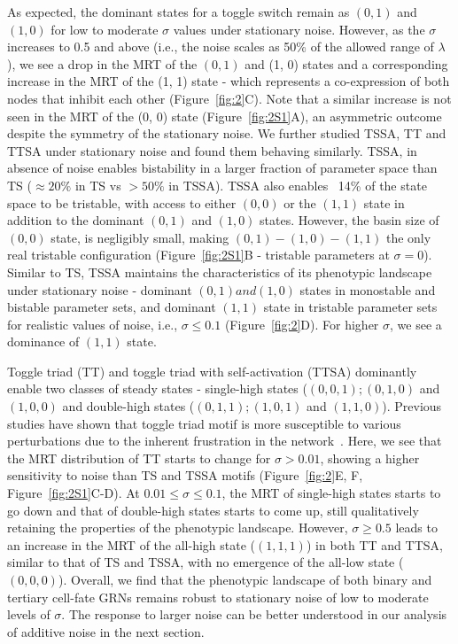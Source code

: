 \documentclass[11pt]{article}
\begin{document}
As expected, the dominant states for a toggle switch remain as $(0, 1)$ and $(1, 0)$ for low to moderate $\sigma$ values under stationary noise. However, as the $\sigma$ increases to 0.5 and above (i.e., the noise scales as 50\% of the allowed range of $\lambda$), we see a drop in the MRT of the $(0,1)$ and (1, 0) states and a corresponding increase in the MRT of the (1, 1) state - which represents a co-expression of both nodes that inhibit each other (Figure~\ref{fig:2}C). Note that a similar increase is not seen in the MRT of the (0, 0) state (Figure~\ref{fig:2S1}A), an asymmetric outcome despite the symmetry of the stationary noise. We further studied TSSA, TT and TTSA under stationary noise and found them behaving similarly. TSSA, in absence of noise enables bistability in a larger fraction of parameter space than TS ($\approx 20\%$ in TS vs $>50\%$ in TSSA). TSSA also enables ~14\% of the state space to be tristable, with access to either $(0, 0)$ or the $(1, 1)$ state in addition to the dominant $(0, 1)$ and $(1, 0)$ states. However, the basin size of $(0, 0)$ state, is negligibly small, making $(0, 1) - (1, 0)-(1, 1)$ the only real tristable configuration (Figure~\ref{fig:2S1}B - tristable parameters at $\sigma = 0$). Similar to TS, TSSA maintains the characteristics of its phenotypic landscape under stationary noise - dominant $(0,1) and (1,0)$ states in monostable and bistable parameter sets, and dominant $(1, 1)$ state in tristable parameter sets for realistic values of noise, i.e., $\sigma \leq 0.1$ (Figure~\ref{fig:2}D). For higher $\sigma$, we see a dominance of $(1, 1)$ state. 

Toggle triad (TT) and toggle triad with self-activation (TTSA) dominantly enable two classes of steady states - single-high states ($(0, 0, 1); (0, 1, 0)$ and $(1, 0, 0)$ and double-high states ($(0, 1, 1); (1, 0, 1)$ and $(1, 1, 0)$). Previous studies have shown that toggle triad motif is more susceptible to various perturbations due to the inherent frustration in the network~\cite{harlapur2022functional, doi:10.1098/rsif.2020.0631}. Here, we see that the MRT distribution of TT starts to change for $\sigma > 0.01$, showing a higher sensitivity to noise than TS and TSSA motifs (Figure~\ref{fig:2}E, F, Figure~\ref{fig:2S1}C-D). At $0.01 \leq \sigma \leq 0.1$, the MRT of single-high states starts to go down and that of double-high states starts to come up, still qualitatively retaining the properties of the phenotypic landscape. However, $\sigma \geq 0.5$ leads to an increase in the MRT of the all-high state ($(1, 1, 1)$) in both TT and TTSA, similar to that of TS and TSSA, with no emergence of the all-low state ($(0, 0, 0)$). Overall, we find that the phenotypic landscape of both binary and tertiary cell-fate GRNs remains robust to stationary noise of low to moderate levels of $\sigma$. The response to larger noise can be better understood in our analysis of additive noise in the next section. 
\end{document}
